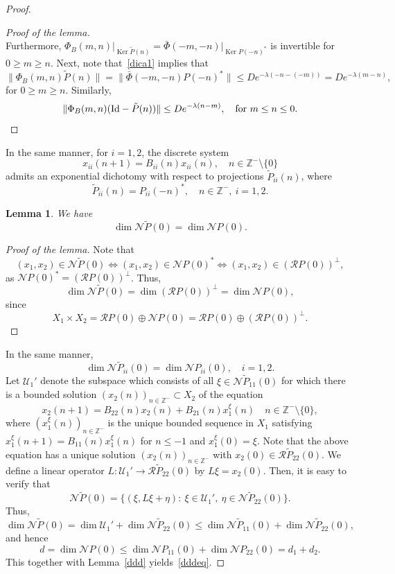 \documentclass[11pt,reqno,a4paper]{amsart}
\theoremstyle{plain}
\numberwithin{equation}{section}
\newtheorem{lemma}{Lemma}
\theoremstyle{remark}
\DeclareMathOperator{\Ker}{Ker}
\def\Id{\text{\rm Id}}
\def\Z{\mathbb{Z}}
\begin{document}
\begin{proof}
\begin{proof}[Proof of the lemma]
\[\]
Furthermore, $\Phi_B(m, n)\rvert_{\Ker \tilde P(n)}=\bar \Phi(-m, -n)\rvert_{\Ker P(-n)^*}$ is invertible for $0\ge m\ge n$.
Next, note that~\eqref{dica1} implies that
\[
\| \Phi_B(m, n)\tilde P(n)\|=\|\bar \Phi(-m, -n)P(-n)^*\| \le De^{-\lambda (-n-(-m))}=De^{-\lambda (m-n)},
\]
for $0\ge m\ge n$. Similarly, 
\[
\|\Phi_B(m, n)(\Id-\tilde P(n))\| \le De^{-\lambda (n-m)}, \quad \text{for $m\le n\le 0$.}
\]
\end{proof}
In the same manner, for $i=1, 2$, the discrete system 
\begin{equation}\label{iid-b}
x_{ii}(n+1)=B_{ii}(n)x_{ii}(n), \quad n\in \Z^-\setminus \{0\}
\end{equation}
admits an exponential dichotomy with respect to projections $\tilde P_{ii}(n)$, where 
\[
\tilde P_{ii}(n)=P_{ii}(-n)^*, \quad n\in \Z^-, \ i=1, 2
.\]
\begin{lemma}\label{832lem}
We have
\[
\dim \mathcal N \tilde P(0)=\dim \mathcal N P(0).
\]
\end{lemma}
\begin{proof}[Proof of the lemma]
Note that 
\[
(x_1, x_2)\in \mathcal N \tilde P(0) \iff (x_1, x_2)\in \mathcal N P(0)^* 
\iff (x_1, x_2)\in (\mathcal R P(0))^\perp,
\]
as $\mathcal N P(0)^*=(\mathcal RP(0))^\perp$. 
Thus,
\[
\dim \mathcal N  \tilde P(0)=\dim (\mathcal R P(0))^\perp=\dim \mathcal N P(0),
\]
since \[X_1\times X_2=\mathcal R P(0)\oplus \mathcal N P(0)=\mathcal R P(0)\oplus (\mathcal R P(0))^\perp.\]
\end{proof}
In the same manner,
\[
\dim \mathcal N \tilde P_{ii}(0)=\dim \mathcal N P_{ii}(0), \quad i=1, 2.
\]
Let $\mathcal U_1'$ denote the subspace which consists of all $\xi \in \mathcal N \tilde P_{11}(0)$ for which there is a bounded solution $(x_2(n))_{n\in \Z^-}\subset X_2$ of the equation
\[
x_2(n+1)=B_{22}(n)x_2(n)+B_{21}(n)x_1^\xi(n) \quad n\in \Z^-\setminus \{0\},
\]
where $(x_1^\xi(n))_{n\in \Z^-}$ is the unique bounded sequence in $X_1$ satisfying $x_1^\xi(n+1)=B_{11}(n)x_1^\xi(n)$ for $n\le -1$ and $x_1^\xi(0)=\xi$. Note that the above equation has a unique solution $(x_2(n))_{n\in \Z^-}$ with $x_2(0)\in \mathcal R \tilde P_{22}(0)$. We define a linear operator $L\colon \mathcal U_1'\to \mathcal R \tilde P_{22}(0)$ by $L\xi=x_2(0)$.  Then, it is easy to verify that 
\[
\mathcal N \tilde P(0)=\{(\xi, L\xi+\eta): \ \xi \in \mathcal U_1', \  \eta \in \mathcal N \tilde P_{22}(0)\}.
\]
Thus,\[
\dim \mathcal N \tilde P(0)=\dim \mathcal U_1'+\dim \mathcal N \tilde P_{22}(0)\le \dim \mathcal N \tilde P_{11}(0)+\dim \mathcal N \tilde P_{22}(0),
\] and hence
\[
d=\dim \mathcal N P(0)\le \dim \mathcal N P_{11}(0)+\dim \mathcal N  P_{22}(0)=d_1+d_2.
\]
This together with Lemma~\ref{ddd} yields~\eqref{dddeq}.
\end{proof}
\end{document}
